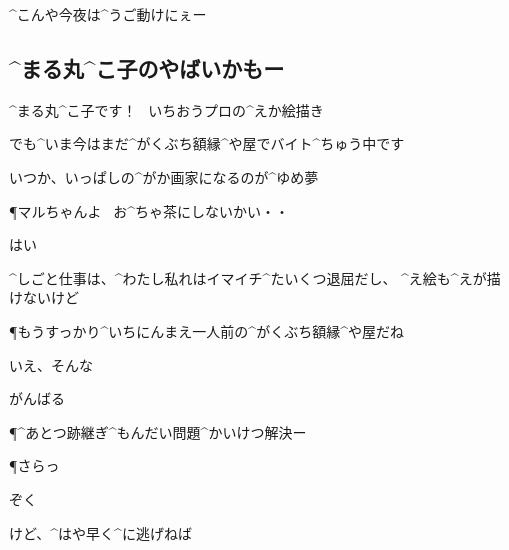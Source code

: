 \page[167]
\A ^{こんや}{今夜}は^{うご}{動}けにぇー


\subsection{^{まる}{丸}^{こ}{子}のやばいかもー}
\R ^{まる}{丸}^{こ}{子}です！
\ いちおうプロの^{えか}{絵描}き

\R でも^{いま}{今}はまだ^{がくぶち}{額縁}^{や}{屋}でバイト^{ちゅう}{中}です

\R いつか、いっぱしの^{がか}{画家}になるのが^{ゆめ}{夢}

\P マルちゃんよ
\ お^{ちゃ}{茶}にしないかい・・

\R はい

\R ^{しごと}{仕事}は、^{わたし}{私}れはイマイチ^{たいくつ}{退屈}だし、
^{え}{絵}も^{えが}{描}けないけど

\P もうすっかり^{いちにんまえ}{一人前}の^{がくぶち}{額縁}^{や}{屋}だね

\R いえ、そんな

\R がんばる

\P ^{あとつ}{跡継}ぎ^{もんだい}{問題}^{かいけつ}{解決}ー

\P さらっ

\R ぞく

\R けど、^{はや}{早}く^{に}{逃}げねば
